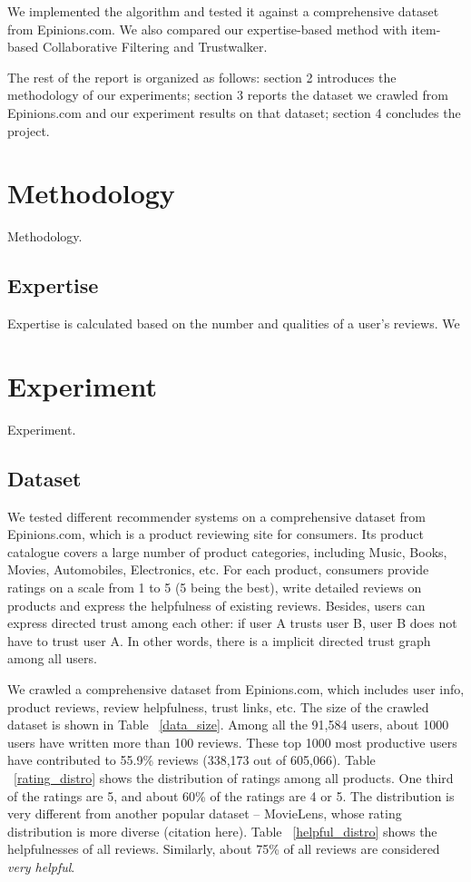 \documentclass[12pt]{article}
\begin{document}
We implemented the algorithm and tested it against a comprehensive dataset from Epinions.com. We also compared our expertise-based method with item-based Collaborative Filtering and Trustwalker. 

The rest of the report is organized as follows: section 2 introduces the methodology of our experiments; section 3 reports the dataset we crawled from Epinions.com and our experiment results on that dataset; section 4 concludes the project. 

\section{Methodology}
Methodology.
\subsection{Expertise}
Expertise is calculated based on the number and qualities of a user's reviews. We 



\section{Experiment}
Experiment.
\subsection{Dataset}
We tested different recommender systems on a comprehensive dataset from Epinions.com, which is a product reviewing site for consumers. Its product catalogue covers a large number of product categories, including Music, Books, Movies, Automobiles, Electronics, etc. For each product, consumers provide ratings on a scale from 1 to 5 (5 being the best), write detailed reviews on products and express the helpfulness of existing reviews. Besides, users can express directed trust among each other: if user A trusts user B, user B does not have to trust user A. In other words, there is a implicit directed trust graph among all users. 

We crawled a comprehensive dataset from Epinions.com, which includes user info, product reviews, review helpfulness, trust links, etc. The size of the crawled dataset is shown in Table ~\ref{data_size}. Among all the 91,584 users, about 1000 users have written more than 100 reviews. These top 1000 most productive users have contributed to 55.9\% reviews (338,173 out of 605,066).  Table ~\ref{rating_distro} shows the distribution of ratings among all products. One third of the ratings are 5, and about 60\% of the ratings are 4 or 5. The distribution is very different from another popular dataset -- MovieLens, whose rating distribution is more diverse (citation here). Table ~\ref{helpful_distro} shows the helpfulnesses of all reviews. Similarly, about 75\% of all reviews are considered \emph{very helpful}. 
\end{document}
